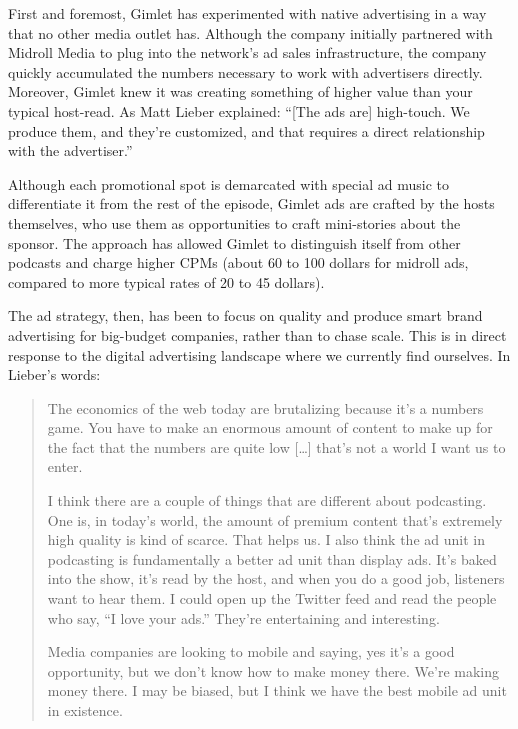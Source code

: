 \documentclass[notoc, symmetric, nobib, nols]{towcenter-guideto-book}
\begin{document}
First and foremost, Gimlet has experimented with native advertising in a way that no other media outlet has. Although the company initially partnered with Midroll Media to plug into the network's ad sales infrastructure, the company quickly accumulated the numbers necessary to work with advertisers directly. Moreover, Gimlet knew it was creating something of higher value than your typical host-read. As Matt Lieber explained: ``[The ads are] high-touch. We produce them, and they're customized, and that requires a direct relationship with the advertiser.''\autocite{lieber} 

Although each promotional spot is demarcated with special ad music to differentiate it from the rest of the episode, Gimlet ads are crafted by the hosts themselves, who use them as opportunities to craft mini-stories about the sponsor. The approach has allowed Gimlet to distinguish itself from other podcasts and charge higher CPMs (about 60 to 100 dollars for midroll ads, compared to more typical rates of 20 to 45 dollars).\autocites{matt, cjr} 

The ad strategy, then, has been to focus on quality and produce smart brand advertising for big-budget companies, rather than to chase scale. This is in direct response to the digital advertising landscape where we currently find ourselves. In Lieber's words:

\begin{quote}
The economics of the web today are brutalizing because it's a numbers game. You have to make an enormous amount of content to make up for the fact that the numbers are quite low […] that's not a world I want us to enter. 

I think there are a couple of things that are different about podcasting. One is, in today's world, the amount of premium content that's extremely high quality is kind of scarce. That helps us. I also think the ad unit in podcasting is fundamentally a better ad unit than display ads. It's baked into the show, it's read by the host, and when you do a good job, listeners want to hear them. I could open up the Twitter feed and read the people who say, ``I love your ads.'' They're entertaining and interesting. 

Media companies are looking to mobile and saying, yes it's a good opportunity, but we don't know how to make money there. We're making money there. I may be biased, but I think we have the best mobile ad unit in existence.\autocite{lieber}
\end{quote}
\end{document}
